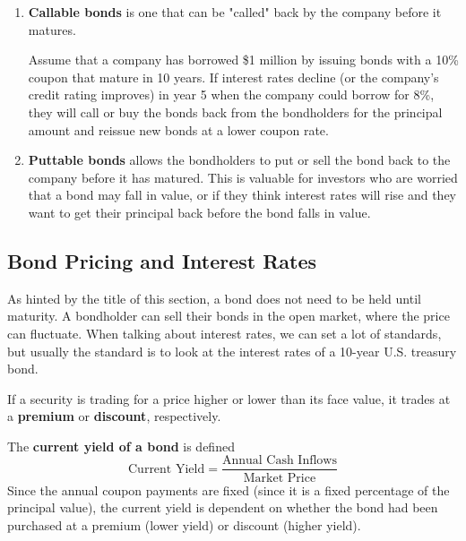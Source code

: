 \documentclass{article}
\begin{document}
\begin{definition}
\begin{enumerate}
      \item \textbf{Callable bonds} is one that can be "called" back by the company before it matures. 
      
      Assume that a company has borrowed \$1 million by issuing bonds with a 10\% coupon that mature in 10 years. If interest rates decline (or the company’s credit rating improves) in year 5 when the company could borrow for 8\%, they will call or buy the bonds back from the bondholders for the principal amount and reissue new bonds at a lower coupon rate. 
      
      \item \textbf{Puttable bonds} allows the bondholders to put or sell the bond back to the company before it has matured. This is valuable for investors who are worried that a bond may fall in value, or if they think interest rates will rise and they want to get their principal back before the bond falls in value.
    \end{enumerate}
  \end{definition}

  \subsection{Bond Pricing and Interest Rates}

    As hinted by the title of this section, a bond does not need to be held until maturity. A bondholder can sell their bonds in the open market, where the price can fluctuate. When talking about interest rates, we can set a lot of standards, but usually the standard is to look at the interest rates of a 10-year U.S. treasury bond. 

    \begin{definition}
      If a security is trading for a price higher or lower than its face value, it trades at a \textbf{premium} or \textbf{discount}, respectively. 
    \end{definition}

    \begin{definition}
      The \textbf{current yield of a bond} is defined 
      \[\text{Current Yield} = \frac{\text{Annual Cash Inflows}}{\text{Market Price}}\]
      Since the annual coupon payments are fixed (since it is a fixed percentage of the principal value), the current yield is dependent on whether the bond had been purchased at a premium (lower yield) or discount (higher yield). 
    \end{definition}
\end{document}
